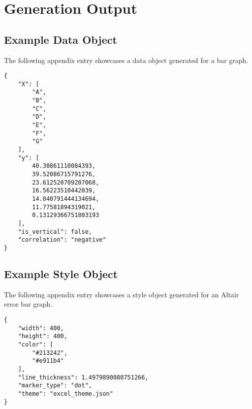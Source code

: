 \chapter[Generation Output]{Generation Output}
\label{AppendixB}

\lstset{
basicstyle=\small\ttfamily,
columns=flexible,
breaklines=true
}

\section{Example Data Object}
The following appendix entry showcases a data object generated for a bar graph.

\hfill 

\begin{lstlisting}
{
    "X": [
        "A",
        "B",
        "C",
        "D",
        "E",
        "F",
        "G"
    ],
    "y": [
        40.30861110084393,
        39.52086715791276,
        23.612520709207068,
        16.56223510442039,
        14.040791444134694,
        11.77581894319021,
        0.13129366751803193
    ],
    "is_vertical": false,
    "correlation": "negative"
}
\end{lstlisting}

\section{Example Style Object}
The following appendix entry showcases a style object generated for an Altair error bar graph.

\hfill

\begin{lstlisting}
{
    "width": 400,
    "height": 400,
    "color": [
        "#213242",
        "#e911b4"
    ],
    "line_thickness": 1.4979890080751266,
    "marker_type": "dot",
    "theme": "excel_theme.json"
}
\end{lstlisting}